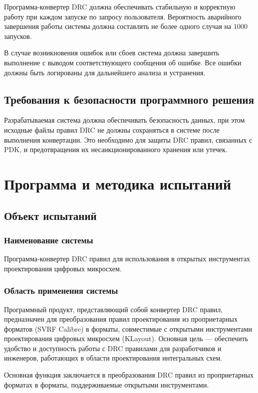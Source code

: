 Программа-конвертер DRC должна обеспечивать стабильную
и корректную работу при каждом запуске по запросу пользователя.
Вероятность аварийного завершения работы системы должна составлять
не более одного случая на 1000 запусков.

В случае возникновения ошибок или сбоев система
должна завершить выполнение с выводом соответствующего сообщения об ошибке.
Все ошибки должны быть логированы для дальнейшего анализа и устранения.

\subsection{Требования к безопасности программного решения}

Разрабатываемая система должна обеспечивать безопасность данных,
при этом исходные файлы правил DRC не должны сохраняться
в системе после выполнения конвертации.
Это необходимо для защиты DRC правил,
связанных с PDK, и предотвращения их несанкционированного хранения или утечек.

\section{Программа и методика испытаний}

\subsection{Объект испытаний}

\subsubsection{Наименование системы}

Программа-конвертер DRC правил для использования
в открытых инструментах проектирования цифровых микросхем.

\subsubsection{Область применения системы}

Программный продукт, представляющий собой конвертер DRC правил,
предназначен для преобразования правил проектирования
из проприетарных форматов (SVRF Calibre) в форматы, совместимые
с открытыми инструментами проектирования цифровых микросхем (KLayout).
Основная цель --- обеспечить удобство
и доступность работы с DRC правилами для разработчиков и инженеров,
работающих в области проектирования интегральных схем.\par
Основная функция заключается в преобразования DRC правил
из проприетарных форматах в форматы,
поддерживаемые открытыми инструментами.


